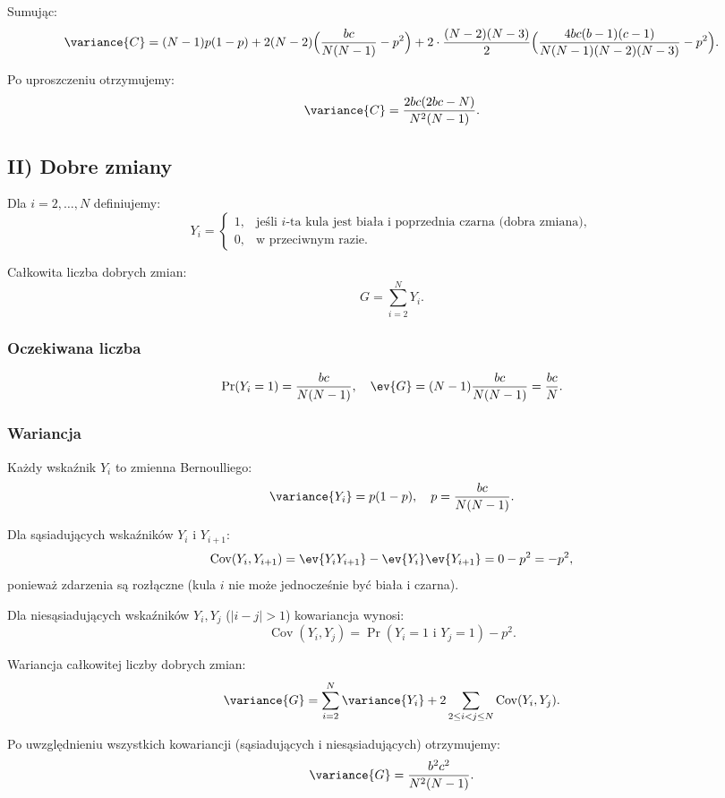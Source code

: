 Sumując:
\[
	\variance{C} = (N-1)p(1-p) + 2 (N-2)\Big(\frac{bc}{N(N-1)} - p^2\Big) + 2\cdot \frac{(N-2)(N-3)}{2}\Big(\frac{4bc(b-1)(c-1)}{N(N-1)(N-2)(N-3)} - p^2\Big).
\]

Po uproszczeniu otrzymujemy:
\[
	\variance{C} = \frac{2bc(2bc-N)}{N^2(N-1)}.
\]

\subsection*{II) Dobre zmiany}

Dla \(i=2,\dots,N\) definiujemy:
\[
	Y_i =
	\begin{cases}
		1, & \text{jeśli } i\text{-ta kula jest biała i poprzednia czarna (dobra zmiana)}, \\
		0, & \text{w przeciwnym razie}.
	\end{cases}
\]

Całkowita liczba dobrych zmian:
\[
	G = \sum_{i=2}^N Y_i.
\]

\subsubsection*{Oczekiwana liczba}

\[
	\Pr(Y_i=1) = \frac{bc}{N(N-1)}, \quad \ev{G} = (N-1)\frac{bc}{N(N-1)} = \frac{bc}{N}.
\]

\subsubsection*{Wariancja}

Każdy wskaźnik \(Y_i\) to zmienna Bernoulliego:
\[
	\variance{Y_i} = p(1-p), \quad p = \frac{bc}{N(N-1)}.
\]

Dla sąsiadujących wskaźników \(Y_i\) i \(Y_{i+1}\):
\[
	\operatorname{Cov}(Y_i, Y_{i+1}) = \ev{Y_i Y_{i+1}} - \ev{Y_i}\ev{Y_{i+1}} = 0 - p^2 = -p^2,
\]
ponieważ zdarzenia są rozłączne (kula \(i\) nie może jednocześnie być biała i czarna).

Dla niesąsiadujących wskaźników \(Y_i, Y_j\) (\(|i-j|>1\)) kowariancja wynosi:
\[
	\operatorname{Cov}(Y_i, Y_j) = \Pr(Y_i=1 \text{ i } Y_j=1) - p^2.
\]

Wariancja całkowitej liczby dobrych zmian:
\[
	\variance{G} = \sum_{i=2}^N \variance{Y_i} + 2\sum_{2\le i<j\le N} \operatorname{Cov}(Y_i,Y_j).
\]

Po uwzględnieniu wszystkich kowariancji (sąsiadujących i niesąsiadujących) otrzymujemy:
\[
	\variance{G} = \frac{b^2 c^2}{N^2 (N-1)}.
\]
